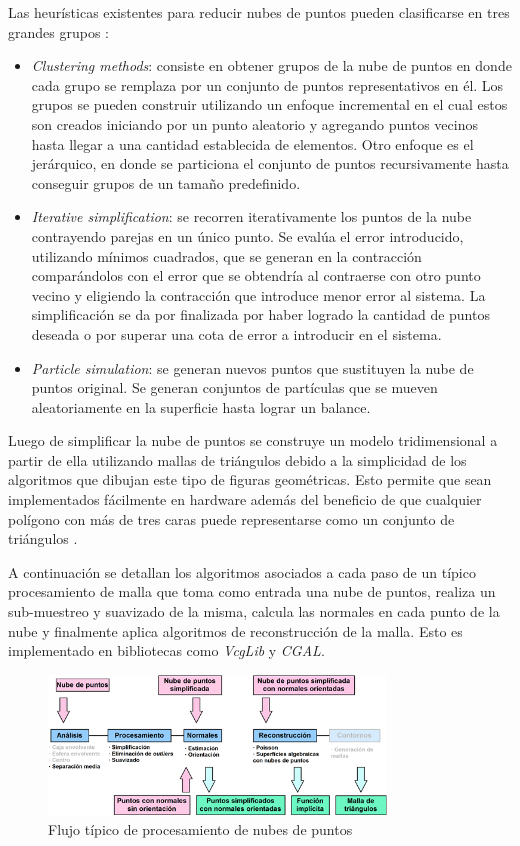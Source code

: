 Las heurísticas existentes para reducir nubes de puntos pueden clasificarse en tres grandes grupos \cite{PntCloud}:
\begin{itemize}
   \item \emph{Clustering methods}: consiste en obtener grupos de la nube de puntos en donde cada grupo se remplaza por un conjunto de puntos representativos en él. Los grupos se pueden construir utilizando un enfoque incremental en el cual estos son creados iniciando por un punto aleatorio y agregando puntos vecinos hasta llegar a una cantidad establecida de elementos. Otro enfoque es el jerárquico, en donde se particiona el conjunto de puntos recursivamente hasta conseguir grupos de un tamaño predefinido.
   \item \emph{Iterative simplification}: se recorren iterativamente los puntos de la nube contrayendo parejas en un único punto. Se evalúa el error introducido, utilizando mínimos cuadrados, que se generan en la contracción comparándolos con el error que se obtendría al contraerse con otro punto vecino y eligiendo la contracción que introduce menor error al sistema. La simplificación se da por finalizada por haber logrado la cantidad de puntos deseada o por superar una cota de error a introducir en el sistema.
   \item \emph{Particle simulation}: se generan nuevos puntos que sustituyen la nube de puntos original. Se generan conjuntos de partículas que se mueven aleatoriamente en la superficie hasta lograr un balance.
\end{itemize}

Luego de simplificar la nube de puntos se construye un modelo tridimensional a partir de ella utilizando mallas de triángulos debido a la simplicidad de los algoritmos que dibujan este tipo de figuras geométricas. Esto permite que sean implementados fácilmente en hardware además del beneficio de que cualquier polígono con más de tres caras puede representarse como un conjunto de triángulos \cite{PCloudTriangle}.

A continuación se detallan los algoritmos asociados a cada paso de un típico procesamiento de malla que toma como entrada una nube de puntos, realiza un sub-muestreo y suavizado de la misma, calcula las normales en cada punto de la nube y finalmente aplica algoritmos de reconstrucción de la malla. Esto es implementado en bibliotecas como \emph{VcgLib}\cite{VCGLib} y \emph{CGAL}\cite{CGAL}.

\begin{figure}[H]
  \centering
    \includegraphics[width=0.8\textwidth]{./Cap2_videomapping/malla-flow-2.png}
  \caption[http://www.cgal.org]{Flujo típico de procesamiento de nubes de puntos}
  \label{fig:Mesh-CGAL}
\end{figure}

